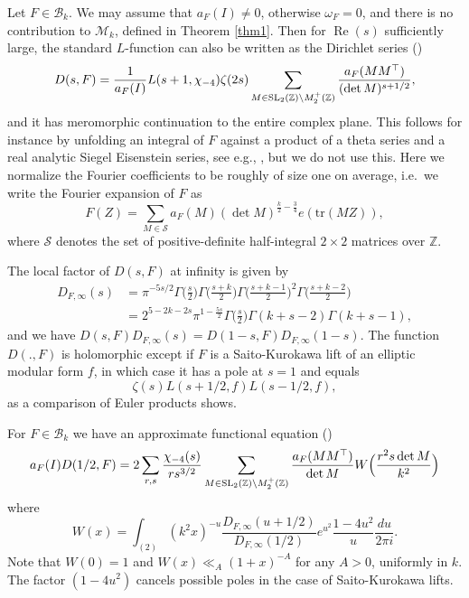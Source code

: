 \documentclass[11pt]{amsart}
\numberwithin{equation}{section}
\theoremstyle{plain}
\theoremstyle{definition}
\newcommand{\re}{\operatorname{Re}}
\numberwithin{equation}{section}
\begin{document}
Let $F\in \mathcal{B}_k$. We may assume that $a_F(I) \not=0$, otherwise $\omega_F = 0$, and there is no contribution to $\mathcal{M}_k$, defined in Theorem \ref{thm1}.  Then for $\re(s)$ sufficiently large,  the standard $L$-function can also be written as the Dirichlet series (\cite{An}) 
\begin{equation}\label{DF}
D(s, F) = \frac{1}{a_F(I)} L(s+1, \chi_{-4})\zeta(2s) \sum_{M \in {\rm SL}_2(\mathbb{Z}) \backslash M_2^+(\mathbb{Z})} \frac{a_F(MM^{\top})}{(\det M)^{s+1/2}},
\end{equation}
and it has meromorphic continuation to the entire complex plane. This follows for instance by unfolding an integral of $F$ against a product of a theta series and a real analytic Siegel Eisenstein series, see e.g., \cite[Prop.~2.3]{AK}, but we do not use this. Here we normalize the Fourier coefficients to be roughly of size one on average, i.e.\ we write the Fourier expansion of $F$ as 
\[ F(Z)=\sum_{M \in \mathcal{S}} a_F(M) (\det M)^{\frac{k}{2} - \frac{3}{4}} e(\text{tr}(MZ)),
\]
where $\mathcal{S}$ denotes the set of positive-definite half-integral $2\times 2$ matrices over $\mathbb{Z}$.

The local factor of $D(s,F)$ at infinity is given by
\begin{align}\label{Linf}
D_{F,\infty}(s) &= \pi^{-5s/2}\Gamma\Big(\frac{s}{2}\Big) \Gamma\Big(\frac{s+k}{2}\Big)\Gamma\Big(\frac{s+k-1}{2}\Big)^2 \Gamma\Big(\frac{s+k-2}{2}\Big) \\
&= 2^{5 - 2k-2s} \pi^{1 - \frac{5s}{2}} \Gamma\Big(\frac{s}{2}\Big) \Gamma(k+ s - 2)\Gamma(k+ s - 1),
\end{align}
and we have $D(s, F) D_{F,\infty}(s)  = D(1-s, F) D_{F,\infty}(1-s) $. The function $D(., F)$ is holomorphic except if $F$ is a Saito-Kurokawa lift of an elliptic modular form $f$, in which case it has a pole at $s=1$ and equals
\begin{equation}\label{lift}
\zeta(s) L(s+1/2, f) L(s - 1/2, f), 
\end{equation}
as a comparison of Euler products shows.

For $F\in \mathcal{B}_k$ we have an approximate functional equation (\cite[Section 5.2]{IK})
\begin{equation}\label{approx}
a_F(I) D(1/2, F)  = 2\sum_{r, s} \frac{\chi_{-4}(s)}{rs^{3/2}} \sum_{M \in {\rm SL}_2(\mathbb{Z}) \backslash M_2^+(\mathbb{Z})} \frac{a_F(MM^{\top})}{\det M} W\Big( \frac{r^2 s \det M}{k^2}\Big)
\end{equation}
where
$$W(x) = \int_{(2)} (k^2 x)^{-u} \frac{D_{F,\infty}(u+1/2)}{D_{F,\infty}(1/2)}e^{u^2} \frac{1-4u^2}{u} \frac{du}{2\pi i}.$$
Note that $W(0) = 1$ and $W(x) \ll_A (1+x)^{-A} $ for any $A> 0$, uniformly in $k$. The factor $(1 - 4u^2)$ cancels possible poles in the case of Saito-Kurokawa lifts. 
\end{document}
